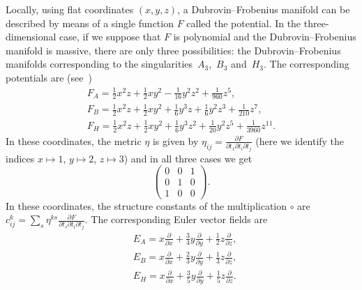 \documentclass[10pt,a4paper]{amsart}
\numberwithin{equation}{section}
\begin{document}
Locally, using flat coordinates $(x,y,z)$, a Dubrovin--Frobenius manifold can be described by means of a single function $F$ called the potential. In the three-dimensional case, if we suppose that $F$ is polynomial and the Dubrovin--Frobenius manifold is massive, there are only three possibilities: the Dubrovin--Frobenius manifolds corresponding to the singularities~$A_{3}$,~$B_{3}$ and~$H_{3}$. The corresponding potentials are (see~\cite[Chapter~1, Example~1.4]{Dubrovin:1994hc})
\begin{gather*}
 F_{A}=\frac{1}{2}x^{2}z+\frac{1}{2}xy^{2}-\frac{1}{16}y^{2}z^{2}+\frac{1}{960}z^{5}, \\
 F_{B}=\frac{1}{2}x^{2}z+\frac{1}{2}xy^{2}+\frac{1}{6}y^{3}z+\frac{1}{6}y^{2}z^{3}+\frac{1}{210}z^{7}, \\
 F_{H}=\frac{1}{2}x^{2}z+\frac{1}{2}xy^{2}+\frac{1}{6}y^{3}z^{2}+\frac{1}{20}y^{2}z^{5}+\frac{1}{3960}z^{11}.
 \end{gather*}
In these coordinates, the metric $\eta$ is given by $\eta_{ij}=\tfrac{\partial F}{\partial t_{1}\partial t_{i}\partial t_{j}}$ (here we identify the indices $x\mapsto 1$, $y\mapsto 2$, $z\mapsto 3$) and in all three cases we get
\begin{equation*}
 \begin{pmatrix}
 0&0&1\\
 0&1&0\\
 1&0&0
 \end{pmatrix}.
\end{equation*}
In these coordinates, the structure constants of the multiplication $\circ$ are $c^{k}_{ij}=\sum_{s}\eta^{ks}\tfrac{\partial F}{\partial t_{s}\partial t_{i}\partial t_{j}}$. The corresponding Euler vector fields are
\begin{align*}
 & E_{A}=x\frac{\partial}{\partial x}+\frac{3}{4}y\frac{\partial}{\partial y}+\frac{1}{2}z\frac{\partial}{\partial z},\\
 & E_{B}=x\frac{\partial}{\partial x}+\frac{2}{3}y\frac{\partial}{\partial y}+\frac{1}{3}z\frac{\partial}{\partial z},\\
 & E_{H}=x\frac{\partial}{\partial x}+\frac{3}{5}y\frac{\partial}{\partial y}+\frac{1}{5}z\frac{\partial}{\partial z}.
\end{align*}
\end{document}
